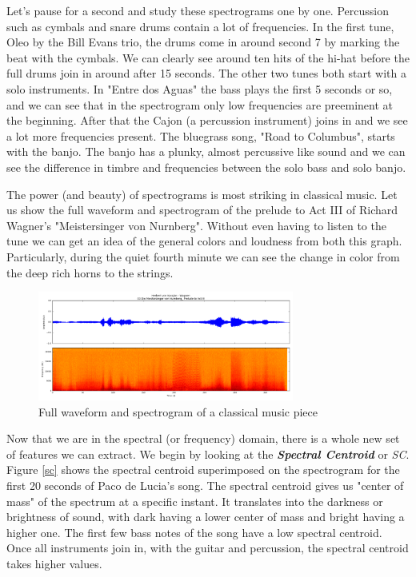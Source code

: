 \documentclass[12pt]{article}
\begin{document}
 \medskip
 
 Let's pause for a second and study these spectrograms one by one. Percussion such as cymbals and snare drums contain a lot of frequencies. In the first tune, Oleo by the Bill Evans trio, the drums come in around second 7 by marking the beat with the cymbals. We can clearly see around ten hits of the hi-hat before the full drums join in around after 15 seconds. The other two tunes both start with a solo instruments. In "Entre dos Aguas" the bass plays the first 5 seconds or so, and we can see that in the spectrogram only low frequencies are preeminent at the beginning. After that the Cajon (a percussion instrument) joins in and we see a lot more frequencies present. The bluegrass song, "Road to Columbus", starts with the banjo. The banjo has a plunky, almost percussive like sound and we can see the difference in timbre and frequencies between the solo bass and solo banjo.
 
\medskip

The power (and beauty) of spectrograms is most striking in classical music. Let us show the full waveform and spectrogram of the prelude to Act III of Richard Wagner's "Meistersinger von Nurnberg". Without even having to listen to the tune we can get an idea of the general colors and loudness from both this graph. Particularly, during the quiet fourth minute we can see the change in color from the deep rich horns to the strings.

\medskip

\begin{figure}
\centering
  \includegraphics[width=0.75\textwidth]{wagner.png}
  \caption{Full waveform and spectrogram of a classical music piece}
  \label{wave_spec}
\end{figure}

\medskip

Now that we are in the spectral (or frequency) domain, there is a whole new set of features we can extract. We begin by looking at the \textbf{\textit{Spectral Centroid}} or \textit{SC}. Figure \ref{sc} shows the spectral centroid superimposed on the spectrogram for the first 20 seconds of Paco de Lucia's song. The spectral centroid gives us "center of mass" of the spectrum at a specific instant. It translates into the darkness or brightness of sound, with dark having a lower center of mass and bright having a higher one. The first few bass notes of the song have a low spectral centroid. Once all instruments join in, with the guitar and percussion, the spectral centroid takes higher values.
\end{document}
